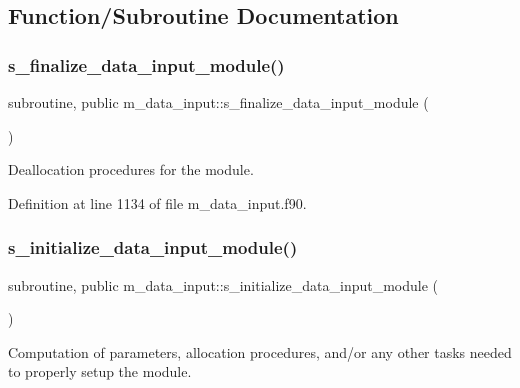 \subsection{Function/\+Subroutine Documentation}
\mbox{\label{namespacem__data__input_aa29d4a799cd1c1cd7d0f05f05f42abe0}} 
\subsubsection{\texorpdfstring{s\+\_\+finalize\+\_\+data\+\_\+input\+\_\+module()}{s\_finalize\_data\_input\_module()}}
{\footnotesize\ttfamily subroutine, public m\+\_\+data\+\_\+input\+::s\+\_\+finalize\+\_\+data\+\_\+input\+\_\+module (\begin{DoxyParamCaption}{ }\end{DoxyParamCaption})}



Deallocation procedures for the module. 



Definition at line 1134 of file m\+\_\+data\+\_\+input.\+f90.

\mbox{\label{namespacem__data__input_a806c2edb19d6a47fd494f8491d2b93d3}} 
\subsubsection{\texorpdfstring{s\+\_\+initialize\+\_\+data\+\_\+input\+\_\+module()}{s\_initialize\_data\_input\_module()}}
{\footnotesize\ttfamily subroutine, public m\+\_\+data\+\_\+input\+::s\+\_\+initialize\+\_\+data\+\_\+input\+\_\+module (\begin{DoxyParamCaption}{ }\end{DoxyParamCaption})}



Computation of parameters, allocation procedures, and/or any other tasks needed to properly setup the module. 



